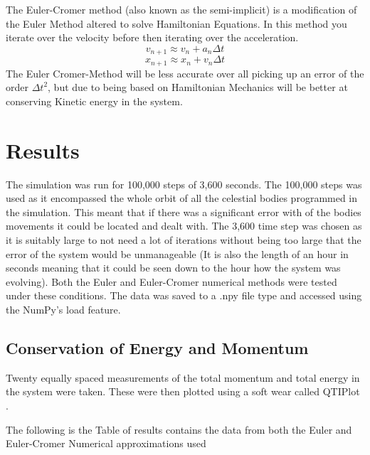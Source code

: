 \documentclass[a4paper,10pt]{article}
\begin{document}
The Euler-Cromer method (also known as the semi-implicit) is a modification of the Euler Method altered to solve Hamiltonian Equations. In this method you iterate over the velocity before then iterating over the acceleration.
\begin{equation}
    v_{n+1} \approx v_{n} + a_{n}\Delta t\label{eq:Euler 2}
\end{equation}
\begin{equation}
    x_{n+1} \approx x_{n} + v_{n}\Delta t \label{eq:Euler 1}
\end{equation}
 The Euler Cromer-Method will be less accurate over all picking up an error of the order ${\Delta t}^2$, but due to being based on Hamiltonian Mechanics will be better at conserving Kinetic energy in the system.


\section{Results}
The simulation was run for 100,000 steps of 3,600 seconds. The 100,000 steps was used as it encompassed the whole orbit of all the celestial bodies programmed in the simulation. This meant that if there was a significant error with of the bodies movements it could be located and dealt with. 
The 3,600 time step was chosen as it is suitably large to not need a lot of iterations without being too large that the error of the system would be unmanageable (It is also the length of an hour in seconds meaning that it could be seen down to the hour how the system was evolving). Both the Euler and Euler-Cromer numerical methods were tested under these conditions. The data was saved to a .npy file type \cite{.npy} and accessed using the NumPy's load feature.



\subsection{Conservation of Energy and Momentum}
Twenty equally spaced measurements of the total momentum and total energy in the system were taken. These were then plotted using a soft wear called QTIPlot \cite{QTIPlot}.

The following is the Table of results contains the data from both the Euler and Euler-Cromer Numerical approximations used
\end{document}
